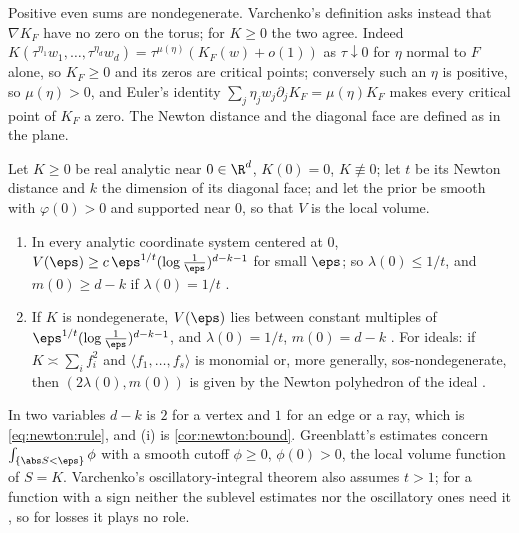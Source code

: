 \begin{refsection}
Positive even sums are nondegenerate. Varchenko's definition asks instead that $\nabla K_F$ have no zero on the torus; for $K\ge0$ the two agree. Indeed $K(\tau^{\eta_1}w_1,\dots,\tau^{\eta_d}w_d)=\tau^{\mu(\eta)}(K_F(w)+o(1))$ as $\tau\downarrow0$ for $\eta$ normal to $F$ alone, so $K_F\ge0$ and its zeros are critical points; conversely such an $\eta$ is positive, so $\mu(\eta)>0$, and Euler's identity $\sum_j\eta_jw_j\partial_jK_F=\mu(\eta)K_F$ makes every critical point of $K_F$ a zero. The Newton distance and the diagonal face are defined as in the plane.

\begin{theorem}\label{thm:newton:general}
Let $K\ge0$ be real analytic near $0\in\R^d$, $K(0)=0$, $K\not\equiv0$; let $t$ be its Newton distance and $k$ the dimension of its diagonal face; and let the prior be smooth with $\varphi(0)>0$ and supported near $0$, so that $V$ is the local volume.
\begin{enumerate}
\item In every analytic coordinate system centered at $0$, $V(\eps)\ge c\,\eps^{1/t}(\log\frac1\eps)^{d-k-1}$ for small $\eps$; so $\lambda(0)\le1/t$, and $m(0)\ge d-k$ if $\lambda(0)=1/t$ \parencite[Theorem~1.2(a)]{Greenblatt2010}.
\item If $K$ is nondegenerate, $V(\eps)$ lies between constant multiples of $\eps^{1/t}(\log\frac1\eps)^{d-k-1}$, and $\lambda(0)=1/t$, $m(0)=d-k$ \parencite[Theorem~1.2(a,b)]{Greenblatt2010}. For ideals: if $K\asymp\sum_if_i^2$ and $\langle f_1,\dots,f_s\rangle$ is monomial or, more generally, sos-nondegenerate, then $(2\lambda(0),m(0))$ is given by the Newton polyhedron of the ideal \parencite[Theorem~1.3]{Lin2017}.
\end{enumerate}
\end{theorem}

In two variables $d-k$ is $2$ for a vertex and $1$ for an edge or a ray, which is \eqref{eq:newton:rule}, and (i) is \cref{cor:newton:bound}. Greenblatt's estimates concern $\int_{\{\abs S<\eps\}}\phi$ with a smooth cutoff $\phi\ge0$, $\phi(0)>0$, the local volume function of $S=K$. Varchenko's oscillatory-integral theorem also assumes $t>1$; for a function with a sign neither the sublevel estimates nor the oscillatory ones need it \parencite[Theorem~1.6(a)]{Greenblatt2010}, so for losses it plays no role.


\end{refsection}
